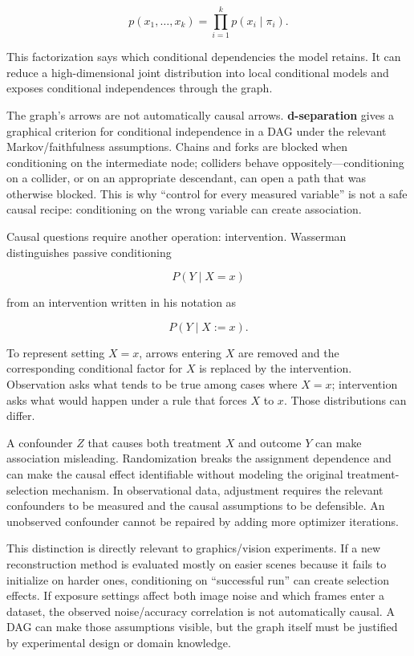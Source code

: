 \[
p(x_1,\ldots,x_k)
=
\prod_{i=1}^{k}
p(x_i\mid \pi_i).
\]

This factorization says which conditional dependencies the model retains. It can reduce a high-dimensional joint distribution into local conditional models and exposes conditional independences through the graph.

The graph's arrows are not automatically causal arrows. \textbf{d-separation} gives a graphical criterion for conditional independence in a DAG under the relevant Markov/faithfulness assumptions. Chains and forks are blocked when conditioning on the intermediate node; colliders behave oppositely---conditioning on a collider, or on an appropriate descendant, can open a path that was otherwise blocked. This is why ``control for every measured variable'' is not a safe causal recipe: conditioning on the wrong variable can create association.

Causal questions require another operation: intervention. Wasserman distinguishes passive conditioning

\[
P(Y\mid X=x)
\]

from an intervention written in his notation as

\[
P(Y\mid X:=x).
\]

To represent setting \(X=x\), arrows entering \(X\) are removed and the corresponding conditional factor for \(X\) is replaced by the intervention. Observation asks what tends to be true among cases where \(X=x\); intervention asks what would happen under a rule that forces \(X\) to \(x\). Those distributions can differ.

A confounder \(Z\) that causes both treatment \(X\) and outcome \(Y\) can make association misleading. Randomization breaks the assignment dependence and can make the causal effect identifiable without modeling the original treatment-selection mechanism. In observational data, adjustment requires the relevant confounders to be measured and the causal assumptions to be defensible. An unobserved confounder cannot be repaired by adding more optimizer iterations.

This distinction is directly relevant to graphics/vision experiments. If a new reconstruction method is evaluated mostly on easier scenes because it fails to initialize on harder ones, conditioning on ``successful run'' can create selection effects. If exposure settings affect both image noise and which frames enter a dataset, the observed noise/accuracy correlation is not automatically causal. A DAG can make those assumptions visible, but the graph itself must be justified by experimental design or domain knowledge.

